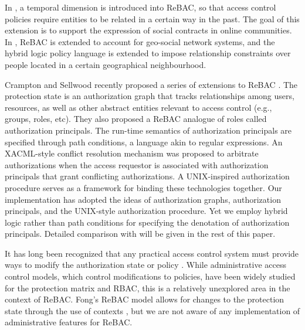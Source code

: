 \documentclass{acm_proc_article-sp}
\begin{document}
\begin{comment}
Set-Theoretic ReBAC (STReBAC) \cite{Aktoudianakis-et-al:2013} employs
a language akin to regular expressions for expressing path policies,
and uses several policy templates for expressing commonly occurring
ReBAC policies.
\end{comment}  

In \cite{Fong-etal:2013}, a temporal dimension is
introduced into ReBAC, so that access control policies require
entities to be related in a certain way in the past. The goal of this
extension is to support the expression of social contracts in online
communities. In \cite{Location}, ReBAC is extended to account for
geo-social network systems, and the hybrid logic policy language is
extended to impose relationship constraints over people located in a
certain geographical neighbourhood.

Crampton and Sellwood recently proposed a series of extensions to
ReBAC \cite{Crampton-Sellwood:2014}.  The protection state is an
authorization graph that tracks relationships among users, resources,
as well as other abstract entities relevant to access control (e.g.,
groups, roles, etc).  They also proposed a ReBAC analogue of roles
called authorization principals.  The run-time semantics of
authorization principals are specified through path conditions, a
language akin to regular expressions.  An XACML-style conflict
resolution mechanism was proposed to arbitrate authorizations when the
access requestor is associated with authorization principals that
grant conflicting authorizations.  A UNIX-inspired authorization
procedure serves as a framework for binding these technologies
together.  Our implementation has adopted the ideas of authorization
graphs, authorization principals, and the UNIX-style authorization
procedure.  Yet we employ hybrid logic rather than path conditions for
specifying the denotation of authorization principals. Detailed
comparison with \cite{Crampton-Sellwood:2014} will be given in the
rest of this paper.

It has long been recognized that any practical access control system
must provide ways to modify the authorization state or policy
\cite{HRU, sandhu1999arbac97}. While administrative access control
models, which control modifications to policies, have been widely
studied for the protection matrix and RBAC, this is a relatively
unexplored area in the context of ReBAC.  Fong's ReBAC model allows
for changes to the protection state through the use of contexts
\cite{Fong:2011}, but we are not aware of any implementation of
administrative features for ReBAC.
\end{document}
